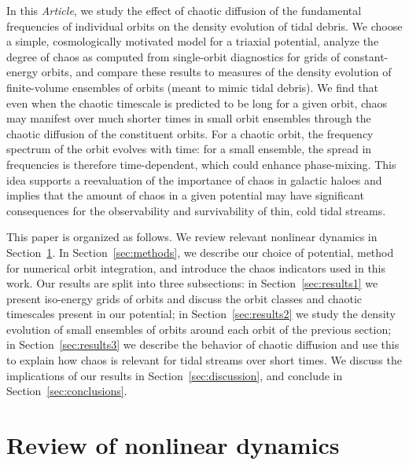 In this \emph{Article}, we study the effect of chaotic diffusion of the
fundamental frequencies of individual orbits on the density evolution of tidal
debris. We choose a simple, cosmologically motivated model for a triaxial
potential, analyze the degree of chaos as computed from single-orbit diagnostics
for grids of constant-energy orbits, and compare these results to measures of
the density evolution of finite-volume ensembles of orbits (meant to mimic tidal
debris). We find that even when the chaotic timescale is predicted to be long
for a given orbit, chaos may manifest over much shorter times in small orbit
ensembles through the chaotic diffusion of the constituent orbits. For a chaotic
orbit, the frequency spectrum of the orbit evolves with time: for a small
ensemble, the spread in frequencies is therefore time-dependent, which could
enhance phase-mixing. This idea supports a reevaluation of the importance of
chaos in galactic haloes and implies that the amount of chaos in a given
potential may have significant consequences for the observability and
survivability of thin, cold tidal streams.

This paper is organized as follows. We review relevant nonlinear dynamics in
Section~\ref{sec:nldreview}. In Section~\ref{sec:methods}, we describe our
choice of potential, method for numerical orbit integration, and introduce the
chaos indicators used in this work. Our results are split into three
subsections: in Section~\ref{sec:results1} we present iso-energy grids of orbits
and discuss the orbit classes and chaotic timescales present in our potential;
in Section~\ref{sec:results2} we study the density evolution of small ensembles
of orbits around each orbit of the previous section; in
Section~\ref{sec:results3} we describe the behavior of chaotic diffusion and use
this to explain how chaos is relevant for tidal streams over short times. We
discuss the implications of our results in Section~\ref{sec:discussion}, and
conclude in Section~\ref{sec:conclusions}.

\section{Review of nonlinear dynamics}\label{sec:nldreview}

